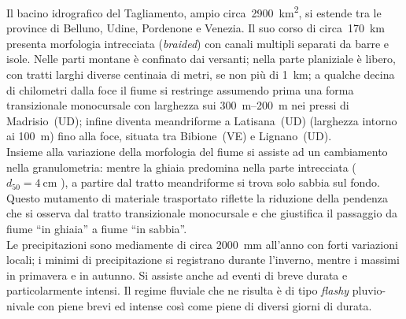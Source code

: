 Il bacino idrografico del Tagliamento, ampio circa~\SI{2900}{\kilo\m\tothe{2}}, si estende tra le province di Belluno, Udine, Pordenone e Venezia.
Il suo corso di circa~\SI{170}{\kilo\m} presenta morfologia intrecciata (\emph{braided}) con canali multipli separati da barre e isole.
Nelle parti montane è confinato dai versanti; 
nella parte planiziale è libero, con tratti larghi diverse centinaia di metri, se non più di \SI{1}{\kilo\m};
a qualche decina di chilometri dalla foce il fiume si restringe assumendo prima una forma transizionale monocursale con larghezza sui \SIrange[range-phrase={-}]{300}{200}{\m} nei pressi di Madrisio~(UD);
infine diventa meandriforme a Latisana~(UD) (larghezza intorno ai \SI{100}{\m}) fino alla foce, situata tra Bibione~(VE) e Lignano~(UD).
\\
Insieme alla variazione della morfologia del fiume si assiste ad un cambiamento nella granulometria: mentre la ghiaia predomina nella parte intrecciata ($d_{50} = \SI{4}{\centi\m}$ ), a partire dal tratto meandriforme si trova solo sabbia sul fondo.
Questo mutamento di materiale trasportato riflette la riduzione della pendenza che si osserva dal tratto transizionale monocursale e che giustifica il passaggio da fiume “in ghiaia” a fiume “in sabbia”.
\\
Le precipitazioni sono mediamente di circa \SI{2000}{\mm} all'anno con forti variazioni locali; i minimi di precipitazione si registrano durante l'inverno, mentre i massimi in primavera e in autunno.
Si assiste anche ad eventi di breve durata e particolarmente intensi.
Il regime fluviale che ne risulta è di tipo \emph{flashy} pluvio-nivale con piene brevi ed intense così come piene di diversi giorni di durata.

